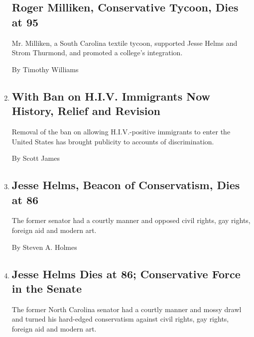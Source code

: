 \begin{enumerate}
  \hypertarget{roger-milliken-conservative-tycoon-dies-at-95}{%
  \subsection{Roger Milliken, Conservative Tycoon, Dies at
  95}\label{roger-milliken-conservative-tycoon-dies-at-95}}

  Mr. Milliken, a South Carolina textile tycoon, supported Jesse Helms
  and Strom Thurmond, and promoted a college's integration.

  By Timothy Williams
\item
  \href{/2010/03/19/us/19sfmetro.html}{}

  \hypertarget{with-ban-on-hiv-immigrants-now-history-relief-and-revision}{%
  \subsection{With Ban on H.I.V. Immigrants Now History, Relief and
  Revision}\label{with-ban-on-hiv-immigrants-now-history-relief-and-revision}}

  Removal of the ban on allowing H.I.V.-positive immigrants to enter the
  United States has brought publicity to accounts of discrimination.

  By Scott James
\item
  \href{/2008/07/05/us/politics/05helms.html}{}

  \hypertarget{jesse-helms-beacon-of-conservatism-dies-at-86}{%
  \subsection{Jesse Helms, Beacon of Conservatism, Dies at
  86}\label{jesse-helms-beacon-of-conservatism-dies-at-86}}

  The former senator had a courtly manner and opposed civil rights, gay
  rights, foreign aid and modern art.

  By Steven A. Holmes
\item
  \href{/2008/07/05/us/politics/00helms.html}{}

  \hypertarget{jesse-helms-dies-at-86-conservative-force-in-the-senate}{%
  \subsection{Jesse Helms Dies at 86; Conservative Force in the
  Senate}\label{jesse-helms-dies-at-86-conservative-force-in-the-senate}}

  The former North Carolina senator had a courtly manner and mossy drawl
  and turned his hard-edged conservatism against civil rights, gay
  rights, foreign aid and modern art.


\end{enumerate}
